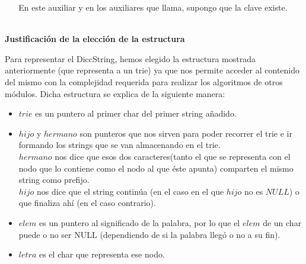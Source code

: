 \documentclass[10pt, a4paper]{article}
\newcommand{\tab}{\hspace*{7mm}}
\newcommand{\modTitulo}[1]{
  \vspace*{1ex}\par\noindent\textbf{\large #1}\par
}
\begin{document}
~
~
En este auxiliar y en los auxiliares que llama, supongo que la clave existe.
~
~
~
\modTitulo{Justificaci\'on de la elecci\'on de la estructura}
Para representar el DiccString, hemos elegido la estructura mostrada anteriormente (que representa a un trie) ya que nos permite acceder al contenido del mismo con la complejidad requerida para realizar los algoritmos de otros m\'odulos. Dicha estructura se explica de la siguiente manera:\\
\begin{itemize}
\item $trie$ es un puntero al primer char del primer string añadido.\\
\item $hijo$ y $hermano$ son punteros que nos sirven para poder recorrer el trie e ir formando los strings que se van almacenando en el trie. \\ \tab $hermano$ nos dice que esos dos caracteres(tanto el que se representa con el nodo que lo contiene como el nodo al que \'este apunta) comparten el mismo string como prefijo.\\
\tab $hijo$ nos dice que el string contin\'ua (en el caso en el que $hijo$ no es $NULL$) o que finaliza ah\'i (en el caso contrario).\\
\item $elem$ es un puntero al significado de la palabra, por lo que el $elem$ de un char puede o no ser NULL (dependiendo de si la palabra lleg\'o o no a su fin).\\
\item $letra$ es el char que representa ese nodo.\\
\end{itemize}
\end{document}
